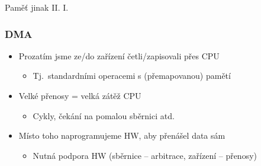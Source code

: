 
\begin{frame}{Paměť jinak \iffimuni II. \else I. \fi}


   \fi

\end{frame}


\begin{frame}
  \frametitle{DMA}

  \begin{itemize}
    \item Prozatím jsme ze/do zařízení četli/zapisovali přes CPU
    \begin{itemize}
      \item Tj.\ standardními operacemi s (přemapovanou) pamětí
    \end{itemize}

    \pause

    \item Velké přenosy = velká zátěž CPU
    \begin{itemize}
      \item Cykly, čekání na pomalou sběrnici atd.
    \end{itemize}

    \pause

    \item Místo toho naprogramujeme HW, aby přenášel data sám
    \begin{itemize}
      \item Nutná podpora HW (sběrnice -- arbitrace, zařízení -- přenosy)
    \end{itemize}
  \end{itemize}

\end{frame}

